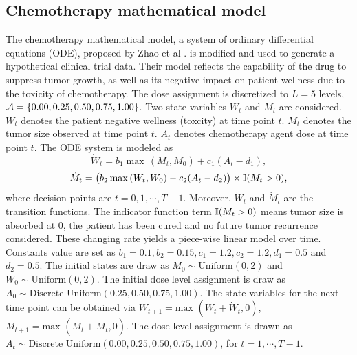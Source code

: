 \subsection{Chemotherapy mathematical model}
The chemotherapy mathematical model, a system of ordinary differential equations (ODE), proposed by Zhao et al \cite{odemodel}. is modified and used to generate a hypothetical clinical trial data. Their model reflects the capability of the drug to suppress tumor growth, as well as its negative impact on patient wellness due to the toxicity of chemotherapy. The dose assignment is discretized to $L=5$ levels, $\mathcal{A} = \left\{0.00, 0.25, 0.50, 0.75, 1.00 \right\}$.  Two state variables $W_t$ and $M_t$ are considered. $W_t$ denotes the patient negative wellness (toxcity) at time point $t$. $M_t$ denotes the tumor size observed at time point $t$. $A_t$ denotes chemotherapy agent dose at time point $t$. The ODE system is modeled as~\cite{odemodel}
$$\dot{W}_t = b_1 \max \,(M_t, M_0) + c_1 (A_t - d_1),$$
$$\dot{M}_t = \left(b_2 \max \,(W_t, W_0) - c_2 (A_t - d_2)\right) \times \mathbb{I} (M_t >0),$$
where decision points are $t= 0, 1,\cdots, T-1$. Moreover, $\dot{W}_t$ and $\dot{M}_t$ are the transition functions.  The indicator function term $\mathbb{I}(M_t > 0)$ means tumor size is absorbed at 0, the patient has been cured and no future tumor recurrence considered. These changing rate yields a piece-wise linear model over time.  Constants value are set as 
$b_1 = 0.1, b_2 = 0.15, c_1 = 1.2, c_2 = 1.2, d_1 = 0.5$ and $d_2 = 0.5$.  The initial states are draw as $M_0 \sim \text{Uniform}(0, 2)$ and $W_0 \sim \text{Uniform}(0, 2)$. The initial dose level assignment is draw as $A_0 \sim \text{Discrete Uniform} ( 0.25, 0.50, 0.75, 1.00 )$. The state variables for the next time point can be obtained via $W_{t+1} = \text{max } (W_t + \dot{W}_t, 0)$, $M_{t+1} = \text{max } (M_t + \dot{M}_t, 0)$.  The dose level assignment is drawn as
$A_t  \sim \text{Discrete Uniform} ( 0.00, 0.25, 0.50, 0.75, 1.00 )$, for $t = 1, \cdots, T-1$.\\

